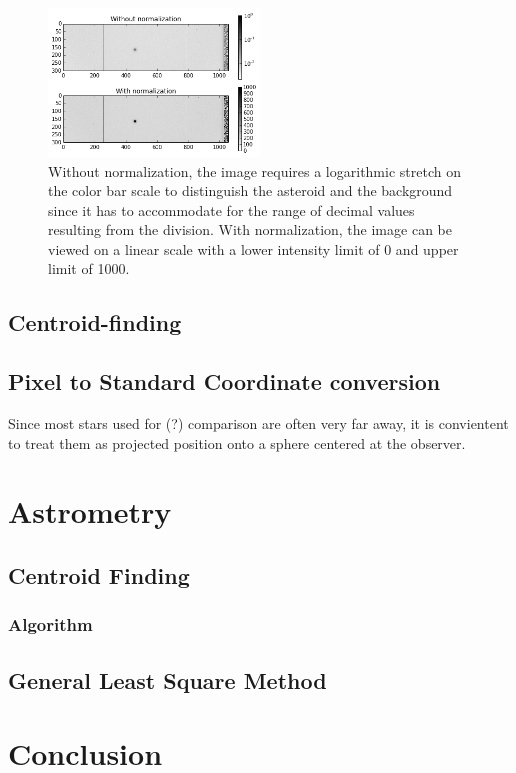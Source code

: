 \documentclass[authoryear, 12pt,5p, times]{elsarticle}
\begin{document}
	\begin{figure}[h!]
\includegraphics[width=0.5\textwidth]{figures/normalization}
\caption{Without normalization, the image requires a logarithmic stretch on the color bar scale to distinguish the asteroid and the background since it has to accommodate for the range of decimal values resulting from the division. With normalization, the image can be viewed on a linear scale with a lower intensity limit of 0 and upper limit of 1000.}
\label{normalization}
\end{figure}

\subsection{Centroid-finding}
\subsection{Pixel to Standard Coordinate conversion}
Since most stars used for (?) comparison are often very far away, it is convientent to treat them as projected position onto a sphere centered at the observer.
\section{Astrometry}
	\subsection{Centroid Finding}
		\subsubsection{Algorithm}
	\subsection{General Least Square Method}

\section{Conclusion}
\end{document}
